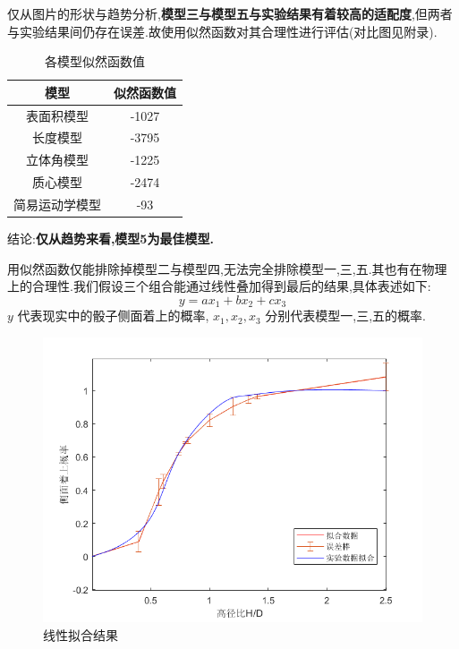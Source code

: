 \documentclass[UTF8]{gapd}
\begin{document}
仅从图片的形状与趋势分析,\textbf{模型三与模型五与实验结果有着较高的适配度},但两者与实验结果间仍存在误差.故使用似然函数对其合理性进行评估(对比图见附录).

\begin{table}[h]
	\centering
\begin{tabular}{cc}
  \toprule[1.5pt]
  模型  & 似然函数值 \\
  \midrule[0.75pt]
  表面积模型     &      -1027 \\
  长度模型       &      -3795 \\
  立体角模型     &      -1225 \\
  质心模型       &      -2474 \\
  简易运动学模型 &        -93 \\

  \bottomrule[1.5pt]
\end{tabular}
\caption{各模型似然函数值}
\end{table}


结论:\textbf{仅从趋势来看,模型5为最佳模型.}

用似然函数仅能排除掉模型二与模型四,无法完全排除模型一,三,五.其也有在物理上的合理性.我们假设三个组合能通过线性叠加得到最后的结果,具体表述如下:
\begin{equation}
y=ax_1+bx_2+cx_3
\end{equation}
  $y$ 代表现实中的骰子侧面着上的概率,  $  x_1,x_2,x_3 $                  分别代表模型一,三,五的概率.
  
 \begin{figure}[h]%
 	\centering
 	\includegraphics[width=0.8\columnwidth]{images/线性拟合误差棒}
 	\caption{线性拟合结果}
 	\label{fig:P2}%
 \end{figure}
\end{document}
